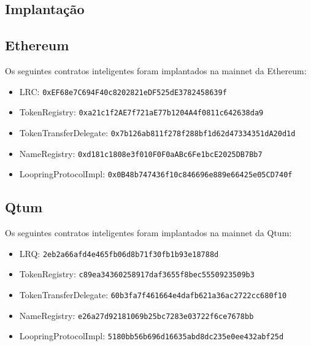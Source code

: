 \documentclass[UTF8,nofonts]{article}
\begin{document}
\begin{appendices}
\section{Implantação}
\subsection{Ethereum}
Os seguintes contratos inteligentes foram implantados na mainnet da Ethereum:
\begin{itemize}
\item LRC: \verb|0xEF68e7C694F40c8202821eDF525dE3782458639f|
\item TokenRegistry: \verb|0xa21c1f2AE7f721aE77b1204A4f0811c642638da9|
\item TokenTransferDelegate: \verb|0x7b126ab811f278f288bf1d62d47334351dA20d1d|
\item NameRegistry: \verb|0xd181c1808e3f010F0F0aABc6Fe1bcE2025DB7Bb7|
\item LoopringProtocolImpl: \verb|0x0B48b747436f10c846696e889e66425e05CD740f|
\end{itemize}
\subsection{Qtum}
Os seguintes contratos inteligentes foram implantados na mainnet da Qtum:
\begin{itemize}
\item LRQ: \verb|2eb2a66afd4e465fb06d8b71f30fb1b93e18788d|
\item TokenRegistry: \verb|c89ea34360258917daf3655f8bec5550923509b3|
\item TokenTransferDelegate: \verb|60b3fa7f461664e4dafb621a36ac2722cc680f10|
\item NameRegistry: \verb|e26a27d92181069b25bc7283e03722f6ce7678bb|
\item LoopringProtocolImpl: \verb|5180bb56b696d16635abd8dc235e0ee432abf25d|
\end{itemize}
\end{appendices}
\end{document}
